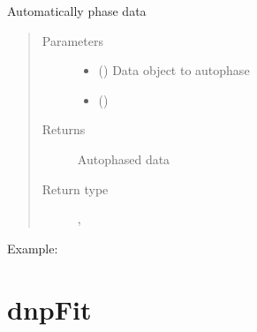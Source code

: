 \documentclass[letterpaper,10pt,english]{sphinxmanual}
\begin{document}
\begin{fulllineitems}
\label{\detokenize{dnpNMR:dnpLab.dnpNMR.autophase}}
Automatically phase data
\begin{quote}\begin{description}
\item[{Parameters}] \leavevmode\begin{itemize}
\item {} 
 ({\hyperref[\detokenize{dnpData:dnpLab.dnpdata_collection}]{}}) \sphinxhyphen{}\sphinxhyphen{} Data object to autophase

\item {} 
 () \sphinxhyphen{}\sphinxhyphen{} 

\end{itemize}

\item[{Returns}] \leavevmode
Autophased data

\item[{Return type}] \leavevmode
{\hyperref[\detokenize{dnpData:dnpLab.dnpdata_collection}]{}}, {\hyperref[\detokenize{dnpData:dnpLab.dnpdata}]{}}

\end{description}\end{quote}

Example:

\begin{sphinxVerbatim}[commandchars=\\\{\}]
   
\end{sphinxVerbatim}

\end{fulllineitems}



\section{dnpFit}
\label{\detokenize{dnpFit:dnpfit}}\label{\detokenize{dnpFit::doc}}
\end{document}
